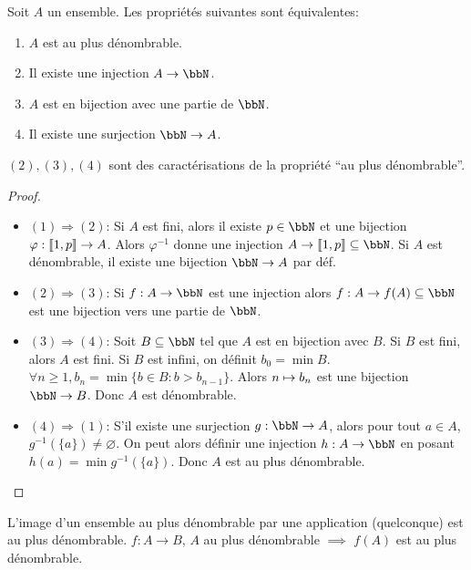 \begin{thm}[comparaison]
    Soit $A$ un ensemble. Les propriétés suivantes sont équivalentes:
    \begin{enumerate}[label=(\arabic*)]
        \item $A$ est au plus dénombrable.
        \item Il existe une injection $A \to \bbN$.
        \item $A$ est en bijection avec une partie de $\bbN$.
        \item Il existe une surjection $\bbN \to A$.
    \end{enumerate}

    $(2), (3), (4)$ sont des caractérisations de la propriété ``au plus dénombrable''.
\end{thm}

\begin{proof}
    $\ $
    \begin{itemize}
        \item $(1) \Rightarrow (2)$:
              Si $A$ est fini, alors il existe $p \in \bbN$ et une bijection $\varphi: \llbracket 1, p \rrbracket \to A$.
              Alors $\varphi^{-1}$ donne une injection $A \to \llb 1, p \rrb \subseteq \bbN$.
              Si $A$ est dénombrable, il existe une bijection $\bbN \to A$ par déf.
        \item $(2) \Rightarrow (3)$:
              Si $f: A \to \bbN$ est une injection alors $f: A \to f(A) \subseteq \bbN$ est une bijection vers une partie de $\bbN$.
        \item $(3) \Rightarrow (4)$:
              Soit $B \subseteq \bbN$ tel que $A$ est en bijection avec $B$.
              Si $B$ est fini, alors $A$ est fini.
              Si $B$ est infini, on définit $b_0 = \min B$.
              $\forall n \geqslant 1, b_n = \min \{ b \in B: b > b_{n - 1} \}$.
              Alors $n \mapsto b_n$ est une bijection $\bbN \to B$.
              Donc $A$ est dénombrable.
        \item $(4) \Rightarrow (1)$:
              S'il existe une surjection $g: \bbN \to A$, alors pour tout $a \in A$, $g^{-1}(\{a\}) \neq \varnothing$.
              On peut alors définir une injection $h: A \to \bbN$ en posant $h(a) = \min g^{-1}(\{a\})$.
              Donc $A$ est au plus dénombrable.
    \end{itemize}
\end{proof}

\begin{cor}
    L'image d'un ensemble au plus dénombrable par une application (quelconque) est au plus dénombrable.
    $f: A \to B$, $A$ au plus dénombrable $\implies$ $f(A)$ est au plus dénombrable.
\end{cor}

